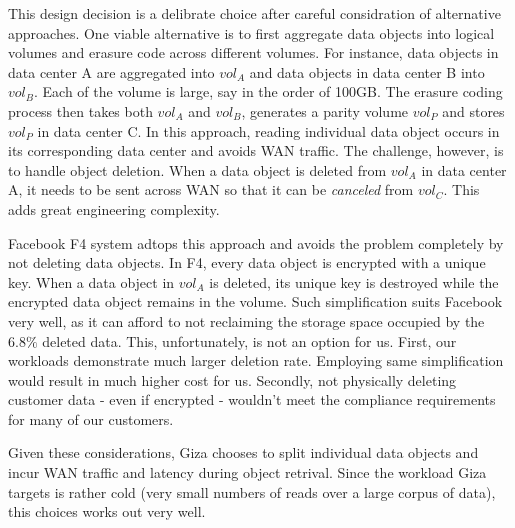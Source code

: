 This design decision is a delibrate choice after careful considration of alternative approaches. One viable alternative is to first aggregate data objects into logical volumes and erasure code across different volumes. For instance, data objects in data center A are aggregated into $vol_A$ and data objects in data center B into $vol_B$. Each of the volume is large, say in the order of 100GB. The erasure coding process then takes both $vol_A$ and $vol_B$,  generates a parity volume $vol_P$ and stores $vol_P$ in data center C. In this approach, reading individual data object occurs in its corresponding data center and avoids WAN traffic. The challenge, however, is to handle object deletion. When a data object is deleted from $vol_A$ in data center A, it needs to be sent across WAN so that it can be {\em canceled} from $vol_C$. This adds great engineering complexity.

Facebook F4 system adtops this approach and avoids the problem completely by not deleting data objects. In F4, every data object is encrypted with a unique key. When a data object in $vol_A$ is deleted, its unique key is destroyed while the encrypted data object remains in the volume. Such simplification suits Facebook very well, as it can afford to not reclaiming the storage space occupied by the  $6.8\%$ deleted data. This, unfortunately, is not an option for us. First, our workloads demonstrate much larger deletion rate. Employing same simplification would result in much higher cost for us. Secondly, not physically deleting customer data - even if encrypted - wouldn't meet the compliance requirements for many of our customers.

Given these considerations, Giza chooses to split individual data objects and incur WAN traffic and latency during object retrival. Since the workload Giza targets is rather cold (very small numbers of reads over a large corpus of data), this choices works out very well.